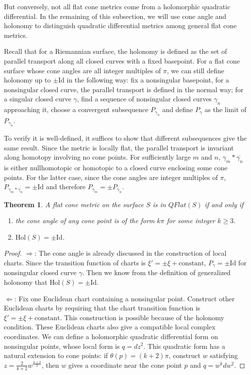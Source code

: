 \documentclass[reqno]{amsart}
\theoremstyle{plain}
\newtheorem{thm}{Theorem}[section]
\theoremstyle{definition}
\theoremstyle{remark}
\theoremstyle{definition}
\newcommand{\?}{\textcolor{red}{?}}
\begin{document}
But conversely, not all flat cone metrics come from a holomorphic quadratic differential. In the remaining of this subsection, we will use cone angle and holonomy to distinguish quadratic differential metrics among general flat cone metrics.

Recall that for a Riemannian surface, the holonomy is defined as the set of parallel transport along all closed curves with a fixed basepoint. For a flat cone surface whose cone angles are all integer multiples of $\pi$, we can still define holonomy up to $\pm\text{Id}$ in the following way: fix a nonsingular basepoint, for a nonsingular closed curve, the parallel transport is defined in the normal way; for a singular closed curve $\gamma$, find a sequence of nonsingular closed curves $\gamma_n$ approaching it, choose a convergent subsequence $P_{\gamma_n}$ and define $P_\gamma$ as the limit of $P_{\gamma_n}$.

To verify it is well-defined, it suffices to show that different subsequences give the same result. Since the metric is locally flat, the parallel transport is invariant along homotopy involving no cone points. For sufficiently large $m$ and $n$, $\gamma_m*\overline{\gamma_n}$ is either nullhomotopic or homotopic to a closed curve enclosing some cone points. For the latter case, since the cone angles are integer multiples of $\pi$, $P_{\gamma_m*\overline{\gamma_n}}=\pm\text{Id}$ and therefore $P_{\gamma_m}=\pm P_{\gamma_n}$.

\begin{thm}\label{angle and holonomy}
A flat cone metric on the surface $S$ is in $QFlat(S)$ if and only if
\begin{enumerate}
    \item[(1)] the cone angle of any cone point is of the form $k\pi$ for some integer $k\ge3$.
    \item[(2)] $\mathrm{Hol}(S) = \pm \mathrm{Id}$.
\end{enumerate}
\end{thm}

\begin{proof}
$\Rightarrow$: The cone angle is already discussed in the construction of local charts. Since the transition function of charts is $\xi' = \pm \xi + \mathrm{constant}$, $P_\gamma=\pm\text{Id}$ for nonsingular closed curve $\gamma$. Then we know from the definition of generalized holonomy that $\text{Hol}(S)=\pm\text{Id}$.

$\Leftarrow$: Fix one Euclidean chart containing a nonsingular point. Construct other Euclidean charts by requiring that the chart transition function is $\xi' = \pm \xi + \mathrm{constant}$. This construction is possible because of the holonomy condition. These Euclidean charts also give a compatible local complex coordinates. We can define a holomorphic quadratic differential form on nonsingular points, whose local form is $q = dz^2$. This quadratic form has a natural extension to cone points: if $\theta(p) = (k+2)\pi$, construct $w$ satisfying $z = \frac{2}{k+2}w^\frac{k+2}{2}$, then $w$ gives a coordinate near the cone point $p$ and $q = w^k dw^2$.
\end{proof}
\end{document}

